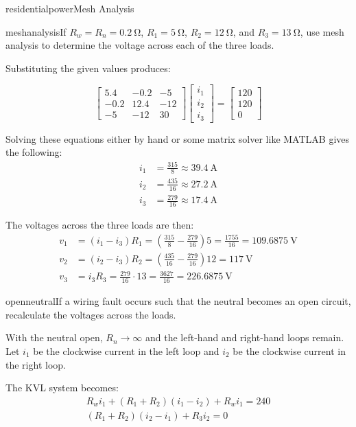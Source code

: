 \begin{mainquestion}{residentialpower}{Mesh Analysis}
\begin{partquestion}{meshanalysis}{If $R_{w}=R_{n}=\qty{0.2}{\ohm}$, $R_{1}=\qty{5}{\ohm}$, $R_{2}=\qty{12}{\ohm}$, and $R_{3}=\qty{13}{\ohm}$, use mesh analysis to determine the voltage across each of the three loads.}
\begin{answer}
Substituting the given values produces:

\[
\begin{bmatrix}
5.4 & -0.2 & -5 \\
-0.2 & 12.4 & -12 \\
-5 & -12 & 30
\end{bmatrix}
\begin{bmatrix}
i_1 \\
i_2 \\
i_3
\end{bmatrix}
=
\begin{bmatrix}
120 \\
120 \\
0
\end{bmatrix}
\]

Solving these equations either by hand or some matrix solver like MATLAB gives the following:
\begin{align*}
    i_1 &= \frac{315}{8} \approx \qty{39.4}{\ampere}\\
    i_2 &= \frac{435}{16} \approx \qty{27.2}{\ampere}\\
    i_3 &= \frac{279}{16} \approx \qty{17.4}{\ampere}
\end{align*}

The voltages across the three loads are then:
\begin{align*}
v_{1} &= (i_{1}-i_{3}) R_{1} = \left( \frac{315}{8} - \frac{279}{16} \right) 5 = \frac{1755}{16} = \qty{109.6875}{\volt} \\
v_{2} &= (i_{2}-i_{3}) R_{2} = \left( \frac{435}{16} - \frac{279}{16} \right) 12 = \qty{117}{\volt} \\
v_{3} &= i_{3} R_{3} = \frac{279}{16} \cdot 13 = \frac{3627}{16} = \qty{226.6875}{\volt}
\end{align*}
\end{answer}
\end{partquestion}

\begin{partquestion}{openneutral}{If a wiring fault occurs such that the neutral becomes an open circuit, recalculate the voltages across the loads.}
\begin{answer}
With the neutral open, $R_{n}\to\infty$ and the left-hand and right-hand loops remain. Let $i_{1}$ be the clockwise current in the left loop and $i_{2}$ be the clockwise current in the right loop.

The KVL system becomes:
\begin{gather*}
R_wi_1 + (R_1 + R_2)(i_1 - i_2) + R_wi_1 = 240 \\
(R_1 + R_2)(i_2 - i_1) + R_3i_2 = 0
\end{gather*}


\end{answer}
\end{partquestion}
\end{mainquestion}
